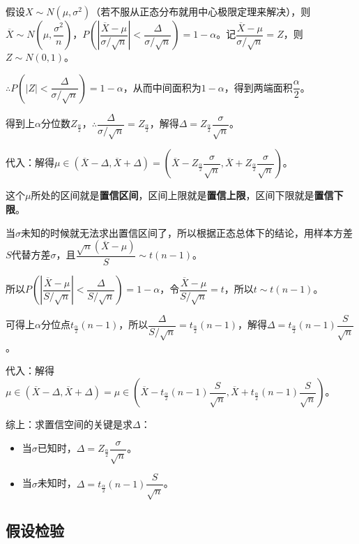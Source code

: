 \documentclass[UTF8, 12pt]{ctexart}
\begin{document}
假设$X\sim N(\mu,\sigma^2)$（若不服从正态分布就用中心极限定理来解决），则$\overline{X}\sim N\left(\mu,\dfrac{\sigma^2}{n}\right)$，$P\left(\left\vert\dfrac{\overline{X}-\mu}{\sigma/\sqrt{n}}\right\vert<\dfrac{\Delta}{\sigma/\sqrt{n}}\right)=1-\alpha$。记$\dfrac{\overline{X}-\mu}{\sigma/\sqrt{n}}=Z$，则$Z\sim N(0,1)$。

$\therefore P\left(\vert Z\vert<\dfrac{\Delta}{\sigma/\sqrt{n}}\right)=1-\alpha$，从而中间面积为$1-\alpha$，得到两端面积$\dfrac{\alpha}{2}$。

得到上$\alpha$分位数$Z_\frac{\alpha}{2}$，$\therefore\dfrac{\Delta}{\sigma/\sqrt{n}}=Z_\frac{\alpha}{2}$，解得$\Delta=Z_\frac{\alpha}{2}\dfrac{\sigma}{\sqrt{n}}$。

代入：解得$\mu\in(\overline{X}-\Delta,\overline{X}+\Delta)=(\overline{X}-Z_\frac{\alpha}{2}\dfrac{\sigma}{\sqrt{n}},\overline{X}+Z_\frac{\alpha}{2}\dfrac{\sigma}{\sqrt{n}})$。

这个$\mu$所处的区间就是\textbf{置信区间}，区间上限就是\textbf{置信上限}，区间下限就是\textbf{置信下限}。

当$\sigma$未知的时候就无法求出置信区间了，所以根据正态总体下的结论，用样本方差$S$代替方差$\sigma$，且$\dfrac{\sqrt{n}(\overline{X}-\mu)}{S}\sim t(n-1)$。

所以$P\left(\left\vert\dfrac{\overline{X}-\mu}{S/\sqrt{n}}\right\vert<\dfrac{\Delta}{S/\sqrt{n}}\right)=1-\alpha$，令$\dfrac{\overline{X}-\mu}{S/\sqrt{n}}=t$，所以$t\sim t(n-1)$。

可得上$\alpha$分位点$t_\frac{\alpha}{2}(n-1)$，所以$\dfrac{\Delta}{S/\sqrt{n}}=t_\frac{\alpha}{2}(n-1)$，解得$\Delta=t_\frac{\alpha}{2}(n-1)\dfrac{S}{\sqrt{n}}$。

代入：解得$\mu\in(\overline{X}-\Delta,\overline{X}+\Delta)=\mu\in(\overline{X}-t_\frac{\alpha}{2}(n-1)\dfrac{S}{\sqrt{n}},\overline{X}+t_\frac{\alpha}{2}(n-1)\dfrac{S}{\sqrt{n}})$。

综上：求置信空间的关键是求$\Delta$：

\begin{itemize}
    \item 当$\sigma$已知时，$\Delta=Z_\frac{\alpha}{2}\dfrac{\sigma}{\sqrt{n}}$。
    \item 当$\sigma$未知时，$\Delta=t_\frac{\alpha}{2}(n-1)\dfrac{S}{\sqrt{n}}$。
\end{itemize}

\subsection{假设检验}
\end{document}
